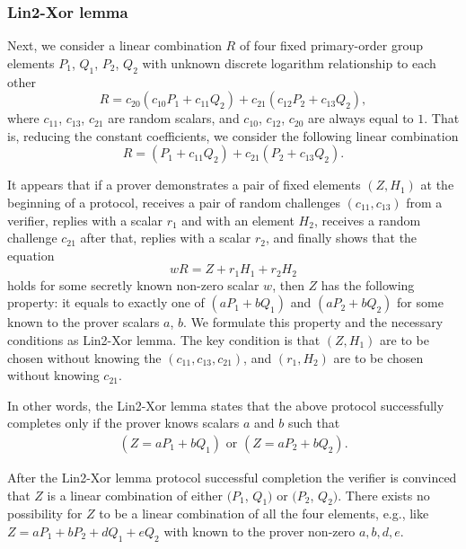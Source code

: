 \documentclass{mathcryptology} %
\theoremstyle{title}
\theoremstyle{titleof}
\begin{document}
\subsubsection{Lin2-Xor lemma}
    Next, we consider a linear combination $R$ of four fixed primary-order group elements $P_{1}$, $Q_{1}$, $P_{2}$, $Q_{2}$ with unknown discrete logarithm relationship to each other
    \begin{equation*}
        R = c_{20} \left(c_{10}P_{1}+c_{11}Q_{2}\right)+c_{21}\left(c_{12}P_{2}+c_{13}Q_{2}\right),
    \end{equation*}
    where $c_{11}$, $c_{13}$, $c_{21}$ are random scalars, and $c_{10}$, $c_{12}$, $c_{20}$ are always equal to $1$. That is, reducing the constant coefficients, we consider the following linear combination
    \begin{equation*}
        R = \left( P_{1} + c_{11} Q_{2}\right) + c_{21} \left(P_{2}+c_{13}Q_{2}\right).
    \end{equation*}
    
    It appears that if a prover demonstrates a pair of fixed elements $(Z, H_{1})$ at the beginning of a protocol, receives a pair of random challenges $(c_{11}, c_{13})$ from a verifier, replies with a scalar $r_{1}$ and with an element $H_{2}$, receives a random challenge $c_{21}$ after that, replies with a scalar $r_{2}$, and finally shows that the equation  
    \begin{equation*}
        wR = Z + r_{1}H_{1} + r_{2}H_{2}
    \end{equation*}
    holds for some secretly known non-zero scalar $w$, then $Z$ has the following property: it equals to exactly one of $\left(a P_{1} + b Q_{1}\right)$ and $\left(a P_{2}+ b Q_{2}\right)$ for some known to the prover scalars $a$, $b$. We formulate this property and the necessary conditions as Lin2-Xor lemma. The key condition is that $\left(Z, H_{1}\right)$ are to be chosen without knowing the $\left(c_{11}, c_{13}, c_{21}\right)$, and $\left(r_{1}, H_{2}\right)$ are to be chosen without knowing $c_{21}$.    
    
    In other words, the Lin2-Xor lemma states that the above protocol successfully completes only if the prover knows scalars $a$ and $b$ such that
    \begin{align*}
        (Z=aP_{1}+bQ_{1}) \text{ or } (Z=aP_{2}+bQ_{2}).
    \end{align*}     
    
    After the Lin2-Xor lemma protocol successful completion the verifier is convinced that $Z$ is a linear combination of either $(P_{1}$, $Q_{1})$ or $(P_{2}$, $Q_{2})$. There exists no possibility for $Z$ to be a linear combination of all the four elements, e.g., like $Z=aP_{1}+ bP_{2}+dQ_{1}+eQ_{2}$ with known to the prover non-zero $a, b, d, e$.  
    
\end{document}
